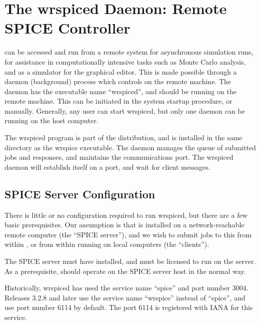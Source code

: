 \section{The {\vt wrspiced} Daemon: Remote SPICE Controller}
\label{wrspiced}


{\WRspice} can be accessed and run from a remote system for
asynchronous simulation runs, for assistance in computationally
intensive tasks such as Monte Carlo analysis, and as a simulator for
the {\Xic} graphical editor.  This is made possible through a daemon
(background) process which controls {\WRspice} on the remote machine. 
The daemon has the executable name ``{\vt wrspiced}'', and should be
running on the remote machine.  This can be initiated in the system
startup procedure, or manually.  Generally, any user can start {\vt
wrspiced}, but only one daemon can be running on the host computer.

The {\vt wrspiced} program is part of the {\WRspice} distribution, and
is installed in the same directory as the {\vt wrspice} executable. 
The daemon manages the queue of submitted jobs and responses, and
maintains the communications port.  The {\vt wrspiced} daemon will
establish itself on a port, and wait for client messages.

\subsection{SPICE Server Configuration}

There is little or no configuration required to run {\vt wrspiced},
but there are a few basic prerequisites.  Our assumption is that
{\WRspice} is installed on a network-reachable remote computer (the
``SPICE server''), and we wish to submit jobs to this {\WRspice} from
within {\Xic}, or from within {\WRspice} running on local computers
(the ``clients'').

The SPICE server must have {\WRspice} installed, and {\WRspice} must
be licensed to run on the server.
As a prerequisite, {\WRspice} should operate on the
SPICE server host in the normal way.

Historically, {\vt wrspiced} has used the service name ``{\vt spice}''
and port number 3004.  Releases 3.2.8 and later use the service name
``{\vt wrspice}'' instead of ``{\vt spice}'', and use port number 6114
by default.  The port 6114 is registered with IANA for this service.

